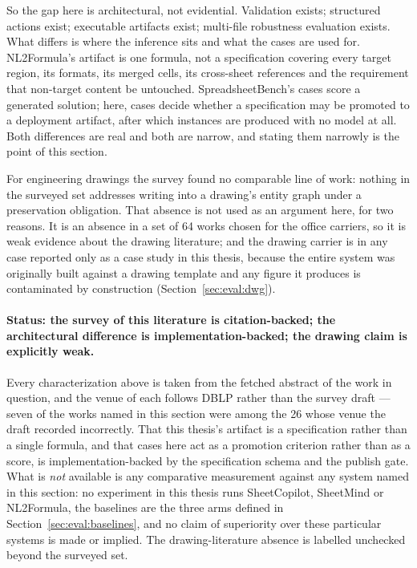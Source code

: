 So the gap here is architectural, not evidential. Validation exists; structured actions exist;
executable artifacts exist; multi-file robustness evaluation exists. What differs is where the
inference sits and what the cases are used for. NL2Formula's artifact is one formula, not a
specification covering every target region, its formats, its merged cells, its cross-sheet
references and the requirement that non-target content be untouched. SpreadsheetBench's cases
score a generated solution; here, cases decide whether a specification may be promoted to a
deployment artifact, after which instances are produced with no model at all. Both differences
are real and both are narrow, and stating them narrowly is the point of this section.

For engineering drawings the survey found no comparable line of work: nothing in the surveyed set
addresses writing into a drawing's entity graph under a preservation obligation. That absence
is not used as an argument here, for two reasons. It is an absence in a set of 64 works chosen
for the office carriers, so it is weak evidence about the drawing literature; and the drawing
carrier is in any case reported only as a case study in this thesis, because the entire system
was originally built against a drawing template and any figure it produces is contaminated by
construction (Section~\ref{sec:eval:dwg}).

\paragraph{Status: the survey of this literature is citation-backed; the architectural
difference is implementation-backed; the drawing claim is explicitly weak.}
Every characterization above is taken from the fetched abstract of the work in question, and
the venue of each follows DBLP rather than the survey draft --- seven of the works named in this
section were among the 26 whose venue the draft recorded incorrectly. That this thesis's
artifact is a specification rather than a single formula, and that cases here act as a promotion
criterion rather than as a score, is implementation-backed by the specification schema and the
publish gate. What is \emph{not} available is any comparative measurement against any system
named in this section: no experiment in this thesis runs SheetCopilot, SheetMind or
NL2Formula, the baselines are the three arms defined in Section~\ref{sec:eval:baselines}, and
no claim of superiority over these particular systems is made or implied. The drawing-literature
absence is labelled unchecked beyond the surveyed set.


